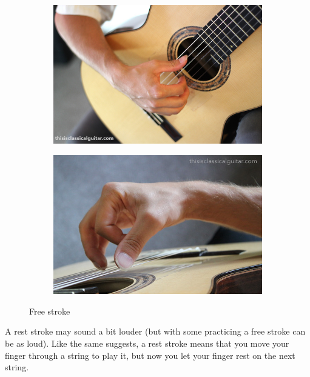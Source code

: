 \begin{figure}[h]
  \begin{subfigure}[b]{0.45\textwidth}
    \includegraphics[width=\textwidth]{../Images/Bradford-right-hand-close-2016.jpg}
    \caption{}
    \label{fig:}
  \end{subfigure}
  \hfill
  \begin{subfigure}[b]{0.45\textwidth}
    \includegraphics[width=\textwidth]{../Images/brad-right-stroke-2016.jpg}
    \caption{}
    \label{fig:}
  \end{subfigure}
  \caption{Free stroke \cite{FreeStrokePositionBradlyWerner}}
  \label{fig:free_stoke_hand_position}
\end{figure}

A rest stroke may sound a bit louder (but with some practicing a free stroke can be as loud). Like the same suggests, a rest stroke means that you move your finger through a string to play it, but now you let your finger rest on the next string.

